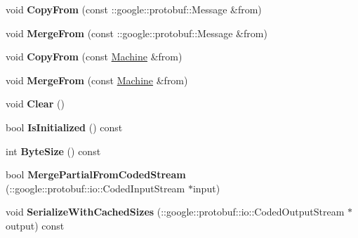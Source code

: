 \begin{DoxyCompactItemize}
\item 
\hypertarget{classmachines_1_1Machine_acea5a9547edd90825e68d4d80e9cb4ed}{void {\bfseries Copy\-From} (const \-::google\-::protobuf\-::\-Message \&from)}\label{classmachines_1_1Machine_acea5a9547edd90825e68d4d80e9cb4ed}

\item 
\hypertarget{classmachines_1_1Machine_aab1a9f0422cb52ca5781abfe38dc6aa8}{void {\bfseries Merge\-From} (const \-::google\-::protobuf\-::\-Message \&from)}\label{classmachines_1_1Machine_aab1a9f0422cb52ca5781abfe38dc6aa8}

\item 
\hypertarget{classmachines_1_1Machine_a1ef5ec4d9c03347fafcbe852c8713810}{void {\bfseries Copy\-From} (const \hyperlink{classmachines_1_1Machine}{Machine} \&from)}\label{classmachines_1_1Machine_a1ef5ec4d9c03347fafcbe852c8713810}

\item 
\hypertarget{classmachines_1_1Machine_a110d8b5bd9c882d5ce284408ce2360fc}{void {\bfseries Merge\-From} (const \hyperlink{classmachines_1_1Machine}{Machine} \&from)}\label{classmachines_1_1Machine_a110d8b5bd9c882d5ce284408ce2360fc}

\item 
\hypertarget{classmachines_1_1Machine_a83f013a6037eb1a0f4bb8f6480fcf203}{void {\bfseries Clear} ()}\label{classmachines_1_1Machine_a83f013a6037eb1a0f4bb8f6480fcf203}

\item 
\hypertarget{classmachines_1_1Machine_ac58156f3089f29f3db2652fd9e0bb5a9}{bool {\bfseries Is\-Initialized} () const }\label{classmachines_1_1Machine_ac58156f3089f29f3db2652fd9e0bb5a9}

\item 
\hypertarget{classmachines_1_1Machine_afadfed0c3b2e6bf73fd6b67e563cf12b}{int {\bfseries Byte\-Size} () const }\label{classmachines_1_1Machine_afadfed0c3b2e6bf73fd6b67e563cf12b}

\item 
\hypertarget{classmachines_1_1Machine_a905f5a8e9551450e7ed999709c0822ad}{bool {\bfseries Merge\-Partial\-From\-Coded\-Stream} (\-::google\-::protobuf\-::io\-::\-Coded\-Input\-Stream $\ast$input)}\label{classmachines_1_1Machine_a905f5a8e9551450e7ed999709c0822ad}

\item 
\hypertarget{classmachines_1_1Machine_a184c7d162b62e3a1c786a85e120447a7}{void {\bfseries Serialize\-With\-Cached\-Sizes} (\-::google\-::protobuf\-::io\-::\-Coded\-Output\-Stream $\ast$output) const }\label{classmachines_1_1Machine_a184c7d162b62e3a1c786a85e120447a7}


\end{DoxyCompactItemize}
